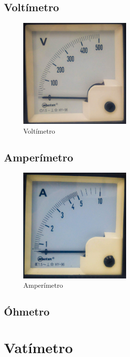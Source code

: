 \subsection{Voltímetro}
\begin{figure}[htbp]
  \centering  
  \includegraphics[width=0.5\textwidth]{images/fotos/voltimetro.jpg}
  \caption{Voltímetro}
  \label{fig:voltimetro}
\end{figure}
\subsection{Amperímetro}

\begin{figure}[htbp]
  \centering
  \includegraphics[width=0.5\textwidth]{images/fotos/amperimetro.jpg}
  \caption{Amperímetro}
  \label{fig:amperimetro}
\end{figure}

\subsection{Óhmetro}
\section{Vatímetro}

